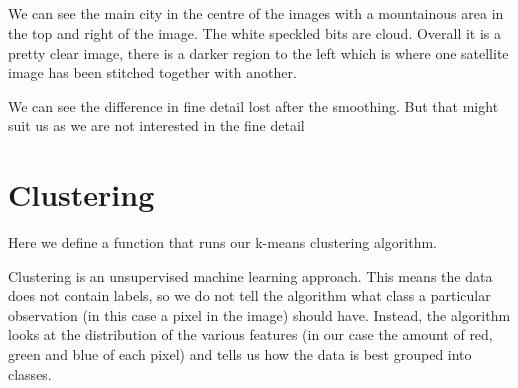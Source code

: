 \documentclass[11pt]{article}
\begin{document}
    \begin{center}
    \end{center}
    { \hspace*{\fill} \\}
    
    \begin{center}
    \end{center}
    { \hspace*{\fill} \\}
    
    \begin{center}
    \end{center}
    { \hspace*{\fill} \\}
    
    \begin{center}
    \end{center}
    { \hspace*{\fill} \\}
    
    We can see the main city in the centre of the images with a mountainous
area in the top and right of the image. The white speckled bits are
cloud. Overall it is a pretty clear image, there is a darker region to
the left which is where one satellite image has been stitched together
with another.

We can see the difference in fine detail lost after the smoothing. But
that might suit us as we are not interested in the fine detail

    \section{Clustering}\label{clustering}

Here we define a function that runs our k-means clustering algorithm.

Clustering is an unsupervised machine learning approach. This means the
data does not contain labels, so we do not tell the algorithm what class
a particular observation (in this case a pixel in the image) should
have. Instead, the algorithm looks at the distribution of the various
features (in our case the amount of red, green and blue of each pixel)
and tells us how the data is best grouped into classes.
\end{document}
